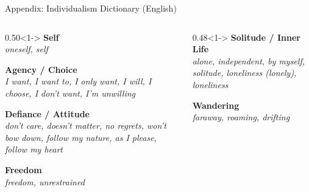 \documentclass[aspectratio=169]{beamer}
\begin{document}
\begin{frame}[label=appendix-indiv-dict-en]{Appendix: Individualism Dictionary (English)}
\footnotesize
\begin{columns}[T]
\begin{column}{0.50\textwidth}<1->
  \textbf{Self} \\
  \textit{oneself, self}

  \smallskip
  \textbf{Agency / Choice} \\
  \textit{I want, I want to, I only want, I will, I choose, I don't want, I'm unwilling}

  \smallskip
  \textbf{Defiance / Attitude} \\
  \textit{don't care, doesn't matter, no regrets, won't bow down, follow my nature, as I please, follow my heart}

  \smallskip
  \textbf{Freedom} \\
  \textit{freedom, unrestrained}
\end{column}
\begin{column}{0.48\textwidth}<1->
  \textbf{Solitude / Inner Life} \\
  \textit{alone, independent, by myself, solitude, loneliness (lonely), loneliness}

  \smallskip
  \textbf{Wandering} \\
  \textit{faraway, roaming, drifting}
\end{column}
\end{columns}

\vspace{0.4em}
\hyperlink{appendix-indiv-dict}{}
\hfill
\hyperlink{appendix-collec-dict}{}
\end{frame}
\end{document}
